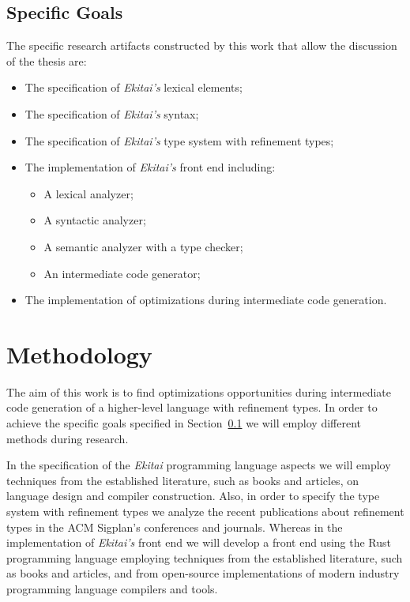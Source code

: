 \documentclass[
  oneside,
  english,
  coorientadorbanca,
  noabntexcite
]{ufsc-thesis-rn46-2019}
\begin{document}
\subsection{Specific Goals}\label{chapter:introduction:sec:goals:specific_goals}
The specific research artifacts constructed by this work that allow the discussion of the thesis are:
\begin{itemize}
  \item The specification of \textit{Ekitai's} lexical elements;
  \item The specification of \textit{Ekitai's} syntax;
  \item The specification of \textit{Ekitai's} type system with refinement types;
  \item The implementation of \textit{Ekitai's} front end including:
        \begin{itemize}
          \item A lexical analyzer;
          \item A syntactic analyzer;
          \item A semantic analyzer with a type checker;
          \item An intermediate code generator;
        \end{itemize}
  \item The implementation of optimizations during intermediate code generation.
\end{itemize}

\section{Methodology}

The aim of this work is to find optimizations opportunities during intermediate code generation of a higher-level language with refinement types.
In order to achieve the specific goals specified in Section~\ref{chapter:introduction:sec:goals:specific_goals} we will employ different methods during research.

In the specification of the \textit{Ekitai} programming language aspects we will employ techniques from the established literature, such as books and articles, on language design and compiler construction.
Also, in order to specify the type system with refinement types we analyze the recent publications about refinement types in the ACM Sigplan's conferences and journals.
Whereas in the implementation of \textit{Ekitai's} front end we will develop a front end using the Rust programming language employing techniques from the established literature, such as books and articles, and from open-source implementations of modern industry programming language compilers and tools.
\end{document}
